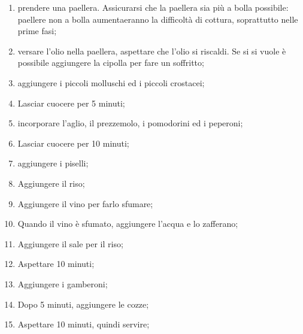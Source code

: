 \begin{enumerate}
    \item prendere una paellera. Assicurarsi che la paellera sia più a bolla possibile: paellere non a bolla aumentaeranno la difficoltà di cottura, soprattutto nelle prime fasi;
    \item versare l'olio nella paellera, aspettare che l'olio si riscaldi. Se si si vuole è possibile aggiungere la cipolla per fare un soffritto;
    \item aggiungere i piccoli molluschi ed i piccoli crostacei;
    \item Lasciar cuocere per 5 minuti;
    \item incorporare l'aglio, il prezzemolo, i pomodorini ed i peperoni; 
    \item Lasciar cuocere per 10 minuti;
    \item aggiungere i piselli;
    \item Aggiungere il riso;
    \item Aggiungere il vino per farlo sfumare;
    \item Quando il vino è sfumato, aggiungere l'acqua e lo zafferano;
    \item Aggiungere il sale per il riso;
    \item Aspettare 10 minuti;
    \item Aggiungere i gamberoni;
    \item Dopo 5 minuti, aggiungere le cozze;
    \item Aspettare 10 minuti, quindi servire;
\end{enumerate}

